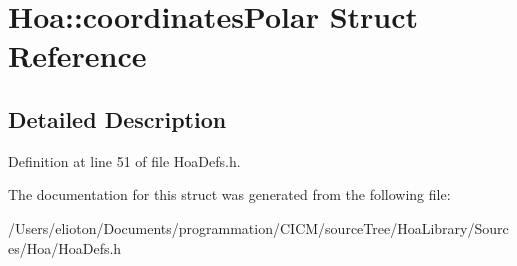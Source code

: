 \hypertarget{struct_hoa_1_1coordinates_polar}{\section{Hoa\-:\-:coordinates\-Polar Struct Reference}
\label{struct_hoa_1_1coordinates_polar}
}


\subsection{Detailed Description}


Definition at line 51 of file Hoa\-Defs.\-h.



The documentation for this struct was generated from the following file\-:\begin{DoxyCompactItemize}
\item 
/\-Users/elioton/\-Documents/programmation/\-C\-I\-C\-M/source\-Tree/\-Hoa\-Library/\-Sources/\-Hoa/Hoa\-Defs.\-h\end{DoxyCompactItemize}
